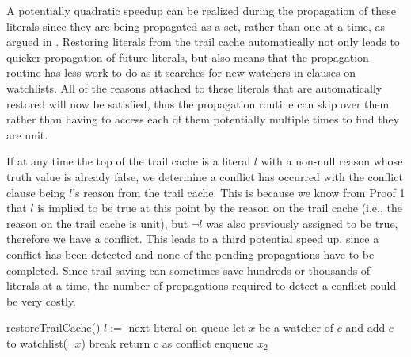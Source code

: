\documentclass[runningheads]{llncs}
\begin{document}
A potentially quadratic speedup can be realized during the propagation
of these literals since they are being propagated as a set, rather
than one at a time, as argued in \cite{DBLP:conf/sat/HickeyB19,DBLP:journals/jair/Gent13}. Restoring literals from the trail cache
automatically not only leads to quicker propagation of future
literals, but also means that the propagation routine has less work to
do as it searches for new watchers in clauses on watchlists. All of
the reasons attached to these literals that are automatically restored
will now be satisfied, thus the propagation routine can skip over them
rather than having to access each of them potentially multiple times
to find they are unit.

If at any time the top of the trail cache is a literal $l$ with a
non-null reason whose truth value is already false, we determine a
conflict has occurred with the conflict clause being $l$'s reason from
the trail cache. This is because we know from Proof 1 that $l$ is
implied to be true at this point by the reason on the trail cache
(i.e., the reason on the trail cache is unit), but $\lnot l$ was also
previously assigned to be true, therefore we have a conflict. This
leads to a third potential speed up, since a conflict has been
detected and none of the pending propagations have to be
completed. Since trail saving can sometimes save hundreds or thousands
of literals at a time, the number of propagations required to detect a
conflict could be very costly.

\begin{algorithm}
	\begin{algorithmic}[1]
        \STATE { }
        \STATE restoreTrailCache()
        \STATE { }
        \STATE $l := $ next literal on queue
        \STATE let $x$ be a watcher of $c$ and add $c$ to watchlist($\neg x$)
        \STATE break
        \ENDIF
		\ENDFOR
        \STATE return c as conflict
        \STATE enqueue $x_2$
        \ENDIF
		\ENDIF
        \ENDFOR
        \ENDWHILE
	\end{algorithmic}
\end{algorithm}

\begin{algorithm}
	\begin{algorithmic}[1]
        \ENDIF
        \ENDWHILE
		\ENDIF
        \ENDIF
	\end{algorithmic}
\end{algorithm}
\end{document}
